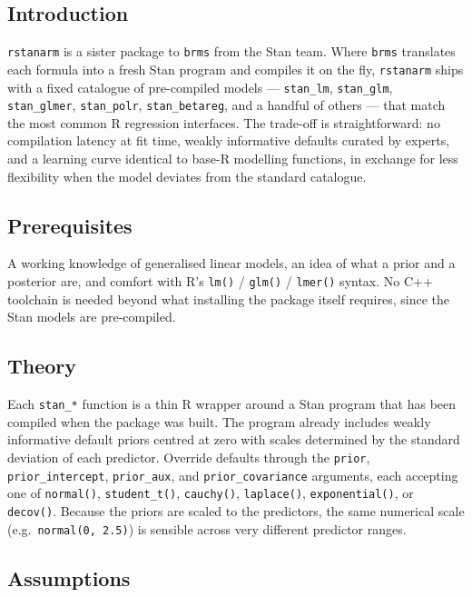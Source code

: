 \documentclass[
]{article}
\author{}
\date{\vspace{-2.5em}}
\begin{document}
\subsection{Introduction}\label{introduction}

\texttt{rstanarm} is a sister package to \texttt{brms} from the Stan
team. Where \texttt{brms} translates each formula into a fresh Stan
program and compiles it on the fly, \texttt{rstanarm} ships with a fixed
catalogue of pre-compiled models --- \texttt{stan\_lm},
\texttt{stan\_glm}, \texttt{stan\_glmer}, \texttt{stan\_polr},
\texttt{stan\_betareg}, and a handful of others --- that match the most
common R regression interfaces. The trade-off is straightforward: no
compilation latency at fit time, weakly informative defaults curated by
experts, and a learning curve identical to base-R modelling functions,
in exchange for less flexibility when the model deviates from the
standard catalogue.

\subsection{Prerequisites}\label{prerequisites}

A working knowledge of generalised linear models, an idea of what a
prior and a posterior are, and comfort with R's \texttt{lm()} /
\texttt{glm()} / \texttt{lmer()} syntax. No C++ toolchain is needed
beyond what installing the package itself requires, since the Stan
models are pre-compiled.

\subsection{Theory}\label{theory}

Each \texttt{stan\_*} function is a thin R wrapper around a Stan program
that has been compiled when the package was built. The program already
includes weakly informative default priors centred at zero with scales
determined by the standard deviation of each predictor. Override
defaults through the \texttt{prior}, \texttt{prior\_intercept},
\texttt{prior\_aux}, and \texttt{prior\_covariance} arguments, each
accepting one of \texttt{normal()}, \texttt{student\_t()},
\texttt{cauchy()}, \texttt{laplace()}, \texttt{exponential()}, or
\texttt{decov()}. Because the priors are scaled to the predictors, the
same numerical scale (e.g.~\texttt{normal(0,\ 2.5)}) is sensible across
very different predictor ranges.

\subsection{Assumptions}\label{assumptions}
\end{document}
